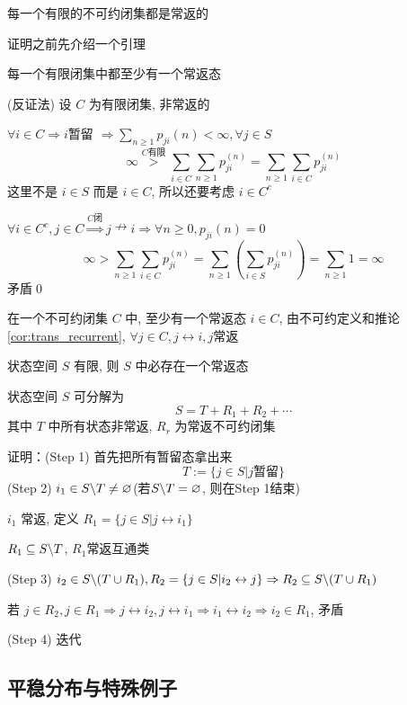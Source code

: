 \begin{theorem}
    每一个有限的不可约闭集都是常返的
\end{theorem}

证明之前先介绍一个引理

\begin{lemma}
    每一个有限闭集中都至少有一个常返态
\end{lemma}

(反证法) 设 $C$ 为有限闭集, 非常返的

$\forall i\in C\Rightarrow i$暂留 $\Rightarrow \sum_{n\geq 1}p_{ji}(n)<\infty,\forall j\in S$
\[
\infty\overset{C\text{有限}}{>}\sum_{i\in C}\sum_{n\geq 1}p_{ji}^{(n)}=\sum_{n\geq 1}\sum_{i\in C}p_{ji}^{(n)}
\]
这里不是 $i\in S$ 而是 $i\in C$, 所以还要考虑 $i\in C^c$

$\forall i\in C^c,j\in C\overset{C\text{闭}}{\Rightarrow}j\nrightarrow i \Rightarrow \forall n\geq 0,p_{ji}(n)=0$
\[
\infty>\sum_{n\geq 1}\sum_{i\in C}p_{ji}^{(n)}=\sum_{n\geq 1}\left(\sum_{i\in S}p_{ji}^{(n)}\right)=\sum_{n\geq 1}1=\infty
\]
矛盾\qed

在一个不可约闭集 $C$ 中, 至少有一个常返态 $i\in C$, 由不可约定义和推论\ref{cor:trans_recurrent}, $\forall j\in C,j\leftrightarrow i,j$常返

\begin{corollary}
    状态空间 $S$ 有限, 则 $S$ 中必存在一个常返态
\end{corollary}

\begin{theorem}[分解定理]
    状态空间 $S$ 可分解为
    \[
    S=T+R_1+R_2+\cdots
    \]
    其中 $T$ 中所有状态非常返, $R_r$ 为常返不可约闭集
\end{theorem}

证明：(Step 1) 首先把所有暂留态拿出来
\[
T:=\{j\in S|j\text{暂留}\}
\]
(Step 2) $i_1\in S\backslash T\neq \varnothing$(若$S\backslash T=\varnothing$, 则在Step 1结束)

$i_1$ 常返, 定义 $R_1=\{j\in S|j\leftrightarrow i_1\}$

$R_1\subseteq S\backslash T$, $R_1$常返互通类

(Step 3) $i_2\in S\backslash (T\cup R_1),R_2=\{j\in S|i_2\leftrightarrow j\}\Rightarrow R_2\subseteq S\backslash (T\cup R_1)$

若 $j\in R_2,j\in R_1\Rightarrow j\leftrightarrow i_2,j\leftrightarrow i_1\Rightarrow i_1\leftrightarrow i_2\Rightarrow i_2\in R_1$, 矛盾

(Step 4) 迭代

\newpage
\subsection{平稳分布与特殊例子}

